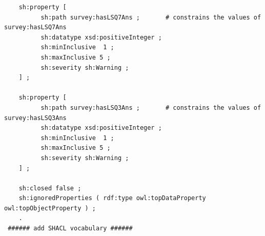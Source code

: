 \begin{lstlisting}
    sh:property [
          sh:path survey:hasLSQ7Ans ;       # constrains the values of survey:hasLSQ7Ans
          sh:datatype xsd:positiveInteger ;
          sh:minInclusive  1 ;
          sh:maxInclusive 5 ;
          sh:severity sh:Warning ;
    ] ;

    sh:property [
          sh:path survey:hasLSQ3Ans ;       # constrains the values of survey:hasLSQ3Ans
          sh:datatype xsd:positiveInteger ;
          sh:minInclusive  1 ;
          sh:maxInclusive 5 ;
          sh:severity sh:Warning ;
    ] ;

    sh:closed false ;
    sh:ignoredProperties ( rdf:type owl:topDataProperty owl:topObjectProperty ) ;
    .
 ###### add SHACL vocabulary ######
\end{lstlisting}
